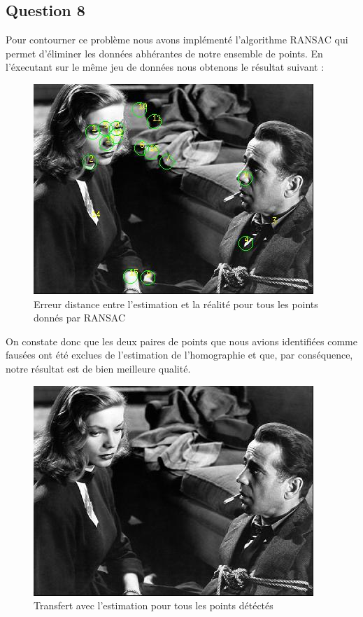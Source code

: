 \documentclass[12pt]{report}
\begin{document}
\subsection{Question 8}

Pour contourner ce problème nous avons implémenté l'algorithme RANSAC qui permet d'éliminer les données abhérantes de notre ensemble de points. En l'éxecutant sur le même jeu de données nous obtenons le résultat suivant :

\begin{figure}[H]
\begin{center}
\includegraphics[scale=0.6]{Images/result_ransac_tp4.jpg}
\caption{Erreur distance entre l'estimation et la réalité pour tous les points donnés par RANSAC}
\end{center}
\end{figure}

On constate donc que les deux paires de points que nous avions identifiées comme fausées ont été exclues de l'estimation de l'homographie et que, par conséquence, notre résultat est de bien meilleure qualité.

\begin{figure}[H]
\begin{center}
\includegraphics[scale=0.6]{Images/transfer_result_ransac_tp4.jpg}
\caption{Transfert avec l'estimation pour tous les points détéctés}
\end{center}
\end{figure}
\end{document}
